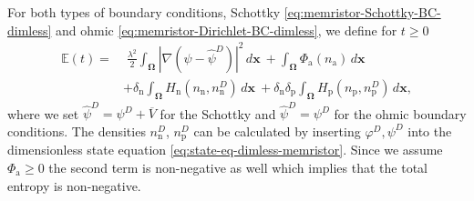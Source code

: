 \documentclass[10pt,a4paper, final]{article}
\def\electrons{\text{n}}
\def\holes{\text{p}}
\def\ions{\text{a}}
\theoremstyle{definition}								%
\numberwithin{equation}{section}
\numberwithin{figure}{section}
\numberwithin{theorem}{section}
\begin{document}
For both types of boundary conditions, Schottky \eqref{eq:memristor-Schottky-BC-dimless} and ohmic \eqref{eq:memristor-Dirichlet-BC-dimless}, we define for $t \geq 0$
\begin{equation}\label{eq:continuous-entropy}
    \begin{split}
        \mathbb{E}(t) =
        &\;\frac{\lambda^2}{2}\int_{\mathbf{\Omega}} |\nabla (\psi - \hat{\psi}^D)|^2\,d\mathbf{x}
        ~
        + \int_{\mathbf{\Omega}} \Phi_{\ions}(n_{\ions})\,d\mathbf{x}\\
        ~
        &+ \delta_\electrons \int_{\mathbf{\Omega}} H_\electrons(n_\electrons, n_\electrons^D)  \,d\mathbf{x}
        ~
        +  \delta_\electrons \delta_\holes  \int_{\mathbf{\Omega}} H_\holes(n_\holes, n_\holes^D)  \,d\mathbf{x},
    \end{split}
\end{equation}
where we set $\hat{\psi}^D = \psi^D + \overline{V}$ for the Schottky and $\hat{\psi}^D = \psi^D$  for the ohmic boundary conditions.
The densities $n_\electrons^D$, $n_\holes^D$ can be calculated by inserting $\varphi^D, \psi^D$ into the dimensionless state equation \eqref{eq:state-eq-dimless-memristor}.
Since we assume $\Phi_{\ions} \geq 0$ the second term is non-negative as well which implies that the total entropy is non-negative.
\end{document}
